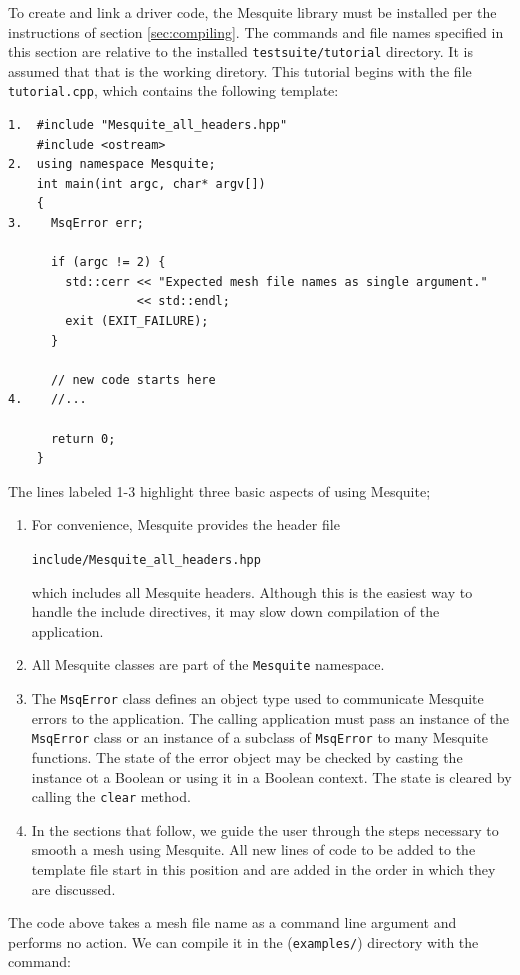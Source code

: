 To create and link a driver code, the Mesquite library must be
installed per the instructions of section \ref{sec:compiling}.
The commands and file names specified in this section are relative
to the installed \texttt{testsuite/tutorial} directory.  It
is assumed that that is the working diretory.
This tutorial begins with the file \texttt{tutorial.cpp},
which contains the following template:
\begin{verbatim}
1.  #include "Mesquite_all_headers.hpp"
    #include <ostream>
2.  using namespace Mesquite;
    int main(int argc, char* argv[])
    {
3.    MsqError err;

      if (argc != 2) {
        std::cerr << "Expected mesh file names as single argument."
                  << std::endl;
        exit (EXIT_FAILURE);
      }

      // new code starts here
4.    //...

      return 0;
    }
\end{verbatim}
The lines labeled 1-3 highlight three basic aspects of using Mesquite;
\begin{enumerate}
\item For convenience, Mesquite provides the header file
\begin{center}
\texttt{include/Mesquite\_all\_headers.hpp}
\end{center} which includes all Mesquite
headers. Although this is the easiest way to handle the include directives,
it may slow down compilation of the application.
\item All Mesquite classes are part of the \texttt{Mesquite} namespace.

\item  The \texttt{MsqError} class defines an object type used to communicate
Mesquite errors to the application.  The calling application must pass
an instance of the \texttt{MsqError} class or an instance of a subclass of
\texttt{MsqError} to many Mesquite functions.  The state of the error object
may be checked by casting the instance ot a Boolean or using it in a
Boolean context.  The state is cleared by calling the \texttt{clear} method.
\item In the sections that follow, we guide the user through the steps
necessary to smooth a mesh using Mesquite.  All new lines of code to be
added to the template file start in this position and are added in the order
in which they are discussed.
\end{enumerate}

The code above takes a mesh file name as a command line argument and
performs no action. We can compile it in the
(\texttt{examples/}) directory with the command:

